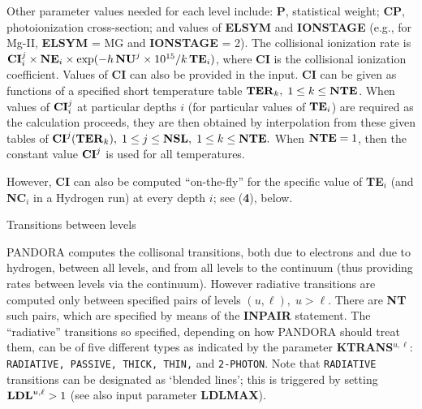 Other parameter values needed for each level include: {\bf P}, statistical
weight; {\bf CP}, photoionization cross-section; and values of {\bf ELSYM} and
{\bf IONSTAGE} (e.g., for Mg-II, {\bf ELSYM} = MG and {\bf IONSTAGE} = 2).
\blankline
The collisional ionization rate is ${\bf CI}^j_i \times {\bf NE}_i \times
\exp(-h \, {\bf NU}^j \times 10^{15} / k \, {\bf TE}_i)$, where {\bf CI} is the
collisional ionization coefficient. Values of {\bf CI} can also be
provided in the input. {\bf CI} can be given as functions of a specified short
temperature table ${\bf TER}_k, \; 1 \leq k \leq {\bf NTE}$. When values of
${\bf CI}^j_i$ at particular depths $i$ (\ie for particular values of
${\bf TE}_i$) are required as the calculation proceeds, they are then
obtained by interpolation from these given tables of
${\bf CI}^j({\bf TER}_k), \; 1 \leq j \leq {\bf NSL}, \; 1 \leq k \leq {\bf NTE}.$
When ${\bf NTE} = 1$, then the constant value ${\bf CI}^j$ is used for all
temperatures.

However, {\bf CI} can also be computed ``on-the-fly''
for the specific value of {\bf TE}$_i$ (and {\bf NC}$_i$ in a Hydrogen run)
at every depth $i$; see ({\bf 4}), below.
\ej
\centerline{Transitions between levels}
\blankline
PANDORA computes the collisonal transitions, both due to electrons and due
to hydrogen, between all levels, and from all levels to the continuum
(thus providing rates between levels via the continuum). However radiative
transitions are computed only between specified pairs of levels $(u,\ell), 
\; u > \ell$. There are {\bf NT} such pairs, which are specified by means of the
{\bf INPAIR} statement. The ``radiative'' transitions so specified, depending
on how PANDORA should treat them, can be of five different types as indicated
by the parameter {\bf KTRANS}$^{u,\ell}$: {\tt RADIATIVE, PASSIVE,
THICK, THIN,} and {\tt 2-PHOTON}. Note that {\tt RADIATIVE} transitions
can be designated as `blended lines'; this is triggered by setting
${\bf LDL}^{u,\ell} > 1$ (see also input parameter {\bf LDLMAX}).

